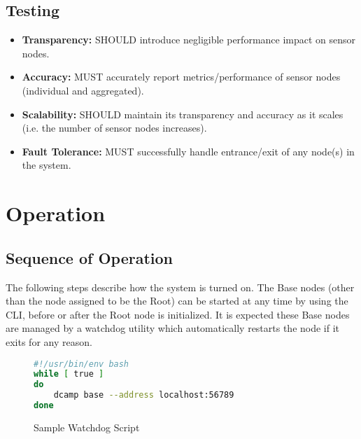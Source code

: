 \subsection{Testing}

\begin{itemize}

\item \textbf{Transparency:} \dcamp SHOULD introduce negligible performance impact on sensor nodes.
\item \textbf{Accuracy:} \dcamp MUST accurately report metrics/performance of sensor nodes (individual and aggregated).
\item \textbf{Scalability:} \dcamp SHOULD maintain its transparency and accuracy as it scales (i.e. the number of sensor
      nodes increases).
\item \textbf{Fault Tolerance:} \dcamp MUST successfully handle entrance/exit of any node(s) in the system.

\end{itemize}

\section{\dcamp Operation}

\subsection{Sequence of \dcamp Operation}
\label{operation_sequnce}

The following steps describe how the \dcamp system is turned on. The Base nodes (other than the node assigned to be the
Root) can be started at any time by using the \dcamp CLI, before or after the Root node is initialized. It is expected
these Base nodes are managed by a watchdog utility which automatically restarts the node if it exits for any reason.

\begin{figure}[H]
\vspace{+10pt}
\begin{lstlisting}[language=bash,frame=single,basicstyle=\footnotesize\ttfamily]
#!/usr/bin/env bash
while [ true ]
do
    dcamp base --address localhost:56789
done
\end{lstlisting}
\vspace{-10pt}
\caption{Sample Watchdog Script}
\label{fig:sample_watchdog}
\end{figure}

